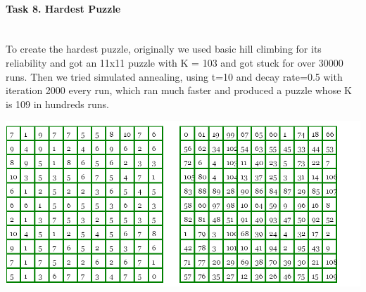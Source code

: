 \documentclass[12pt, letterpaper]{article}
\begin{document}
\pagebreak
\paragraph{Task 8. Hardest Puzzle} \mbox{}\\

To create the hardest puzzle, originally we used basic hill climbing for its reliability and got an 11x11 puzzle with K = 103 and got stuck for over 30000 runs. Then we tried simulated annealing, using t=10 and decay rate=0.5 with iteration 2000 every run, which ran much faster and produced a puzzle whose K is 109 in hundreds runs.

\includegraphics[width=\linewidth]{"Task 8/Hardest Puzzle"}
\end{document}
